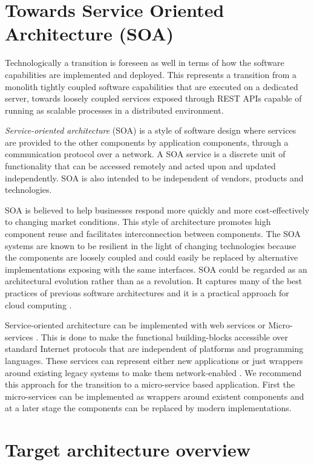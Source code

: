 	\section{Towards Service Oriented Architecture (SOA)}
	\label{sec:soa}
	
	Technologically a transition is foreseen as well in terms of how the software capabilities are implemented and deployed. This represents a transition from a monolith tightly coupled software capabilities that are executed on a dedicated server, towards loosely coupled services exposed through REST APIs capable of running as scalable processes in a distributed environment.
	
	\textit{Service-oriented architecture} (SOA) \cite{open2016soa} is a style of software design where services are provided to the other components by application components, through a communication protocol over a network. A SOA service is a discrete unit of functionality that can be accessed remotely and acted upon and updated independently. SOA is also intended to be independent of vendors, products and technologies.
	
	SOA is believed to help businesses respond more quickly and more cost-effectively to changing market conditions. This style of architecture promotes high component reuse and facilitates interconnection between components. The SOA systems are known to be resilient in the light of changing technologies because the components are loosely coupled and could easily be replaced by alternative implementations exposing with the same interfaces.	SOA could be regarded as an architectural evolution rather than as a revolution. It captures many of the best practices of previous software architectures and it is a practical approach for cloud computing \citep{velte2019cloud}.
	
	Service-oriented architecture can be implemented with web services or Micro-services \citep{brandner2004web}. This is done to make the functional building-blocks accessible over standard Internet protocols that are independent of platforms and programming languages. These services can represent either new applications or just wrappers around existing legacy systems to make them network-enabled \citep{channabasavaiah2003migrating}. We recommend this approach for the transition to a micro-service based application. First the micro-services can be implemented as wrappers around existent components and at a later stage the components can be replaced by modern implementations. 
	
	\section{Target architecture overview}
	

